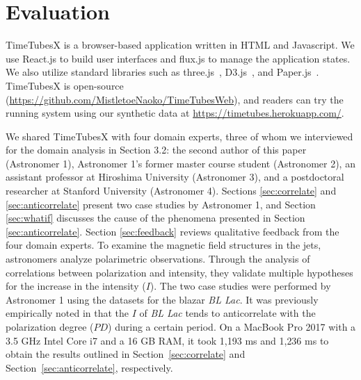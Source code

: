 \section{Evaluation\label{sec:evaluation}}
TimeTubesX is a browser-based application written in HTML and Javascript.
We use React.js to build user interfaces and flux.js to manage the application states.
We also utilize standard libraries such as three.js~\cite{three_framework}, D3.js~\cite{d3_framework}, and Paper.js~\cite{paper_framework}.
TimeTubesX is open-source (\url{https://github.com/MistletoeNaoko/TimeTubesWeb}), and 
readers can try the running system using our synthetic data at \url{https://timetubes.herokuapp.com/}.

We shared TimeTubesX with four domain experts, three of whom we interviewed for the domain analysis in Section 3.2: the second author of this paper (Astronomer 1), Astronomer 1’s former master course student (Astronomer 2), an assistant professor at Hiroshima University (Astronomer 3), and a postdoctoral researcher at Stanford University (Astronomer 4). Sections \ref{sec:correlate} and \ref{sec:anticorrelate} present two case studies by Astronomer 1, and Section \ref{sec:whatif} discusses the cause of the phenomena presented in Section \ref{sec:anticorrelate}. Section \ref{sec:feedback} reviews qualitative feedback from the four domain experts.
To examine the magnetic field structures in the jets, 
astronomers analyze polarimetric observations. 
Through the analysis of correlations between polarization and intensity, 
they validate multiple hypotheses for the increase in the intensity ($I$). 
The two case studies were performed by Astronomer 1 using the datasets for the blazar \emph{BL Lac}. 
It was previously empirically noted in \cite{Gaur2014} that the $I$ of \emph{BL Lac} tends to anticorrelate with the polarization degree ($PD$) during a certain period.
On a MacBook Pro 2017 with a 3.5 GHz Intel Core i7 and a 16 GB RAM, it took 1{,}193 ms and 1{,}236 ms to obtain the results outlined in Section~\ref{sec:correlate} and Section~\ref{sec:anticorrelate}, respectively.
%

